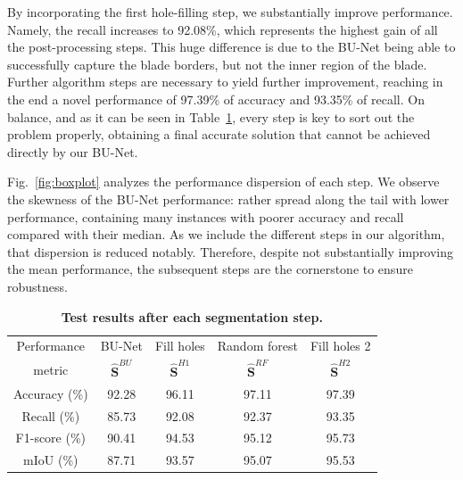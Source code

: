By incorporating the first hole-filling step, we substantially improve performance. Namely, the recall increases to 92.08\%, which represents the highest gain of all the post-processing steps. This huge difference is due to the BU-Net being able to successfully capture the blade borders, but not the inner region of the blade. Further algorithm steps are necessary to yield further improvement, reaching in the end a novel performance of 97.39\% of accuracy and 93.35\% of recall. On balance, and as it can be seen in Table~\ref{tab:seg-accuracy}, every step is key to sort out the problem properly, obtaining a final accurate solution that cannot be achieved directly by our BU-Net. 

Fig.~\ref{fig:boxplot} analyzes the performance dispersion of each step. We observe the skewness of the BU-Net performance: rather spread along the tail with lower performance, containing many instances with poorer accuracy and recall compared with their median. As we include the different steps in our algorithm, that dispersion is reduced notably. Therefore, despite not substantially improving the mean performance, the subsequent steps are the cornerstone to ensure robustness.

\begin{table}[t!]
\centering
\caption{\textbf{Test results after each segmentation step.} }
    \vspace{-0cm}
    \label{tab:seg-accuracy}
\resizebox{8.5 cm}{!} {
\begin{tabular}{ccccc}
\toprule
     \multicolumn{1}{c}{Performance} & \multicolumn{1}{c}{BU-Net} &   \multicolumn{1}{c}{Fill holes}  &  \multicolumn{1}{c}{Random forest}  &  \multicolumn{1}{c}{Fill holes 2}\\
    \multicolumn{1}{c}{metric} &  \multicolumn{1}{c}{${\hat{\mathbf{S}}}^{BU}$} &   \multicolumn{1}{c}{$\hat{\mathbf{S}}^{H1}$} &  \multicolumn{1}{c}{$\hat{\mathbf{S}}^{RF}$} &  \multicolumn{1}{c}{$\hat{\mathbf{S}}^{H2}$} \\ \midrule
   Accuracy (\%) &  92.28 & 96.11 & 97.11 & 97.39\\
   Recall (\%) &  85.73 & 92.08 & 92.37 & 93.35 \\
   F1-score (\%) & 90.41 & 94.53 & 95.12 & 95.73 \\
   mIoU (\%) & 87.71 & 93.57 & 95.07 &  95.53 \\
\bottomrule
\end{tabular}}
\vspace{-0.25cm}
\end{table}

